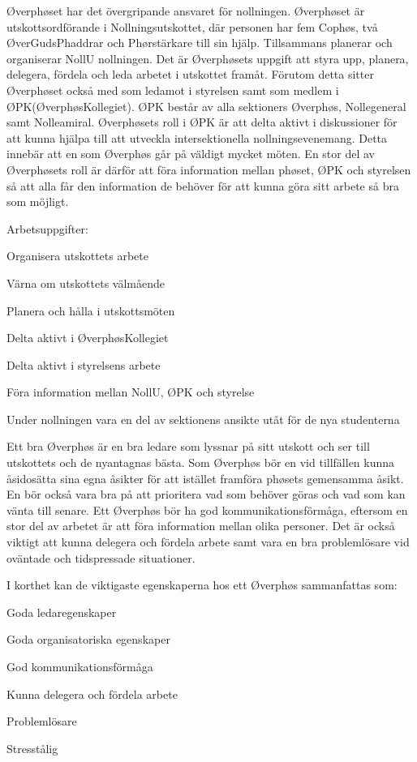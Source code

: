 \documentclass[10pt]{article}
\def\post{Øverphøs}
\def\doctitle{Kravprofil för \post}
\begin{document}
\heading{\doctitle}


Øverphøset har det övergripande ansvaret för nollningen. Øverphøset är utskottsordförande i Nollningsutskottet, där personen har fem Cophøs, två ØverGudsPhaddrar och Phørstärkare till sin hjälp. Tillsammans planerar och organiserar NollU nollningen. Det är Øverphøsets uppgift att styra upp, planera, delegera, fördela och leda arbetet i utskottet framåt. Förutom detta sitter Øverphøset också med som ledamot i styrelsen samt som medlem i ØPK(ØverphøsKollegiet). ØPK består av alla sektioners Øverphøs, Nollegeneral samt Nolleamiral. Øverphøsets roll i ØPK är att delta aktivt i diskussioner för att kunna hjälpa till att utveckla intersektionella nollningsevenemang. Detta innebär att en som Øverphøs går på väldigt mycket möten. En stor del av Øverphøsets roll är därför att föra information mellan phøset, ØPK och styrelsen så att alla får den information de behöver för att kunna göra sitt arbete så bra som möjligt.


Arbetsuppgifter:
\begin{dashlist}
	\item Organisera utskottets arbete
	\item Värna om utskottets välmående
	\item Planera och hålla i utskottsmöten
	\item Delta aktivt i ØverphøsKollegiet
	\item Delta aktivt i styrelsens arbete
	\item Föra information mellan NollU, ØPK och styrelse
	\item Under nollningen vara en del av sektionens ansikte utåt för de nya studenterna
\end{dashlist}

Ett bra {\post} är en bra ledare som lyssnar på sitt utskott och ser till utskottets och de nyantagnas bästa. Som Øverphøs bör en vid tillfällen kunna åsidosätta sina egna åsikter för att istället framföra phøsets gemensamma åsikt. En bör också vara bra på att prioritera vad som behöver göras och vad som kan vänta till senare. Ett Øverphøs bör ha god kommunikationsförmåga, eftersom en stor del av arbetet är att föra information mellan olika personer. Det är också viktigt att kunna delegera och fördela arbete samt vara en bra problemlösare vid oväntade och tidspressade situationer.

I korthet kan de viktigaste egenskaperna hos ett {\post} sammanfattas som:
\begin{dashlist}
	\item Goda ledaregenskaper
	\item Goda organisatoriska egenskaper
	\item God kommunikationsförmåga
	\item Kunna delegera och fördela arbete
	\item Problemlösare
	\item Stresstålig
\end{dashlist}
\end{document}
